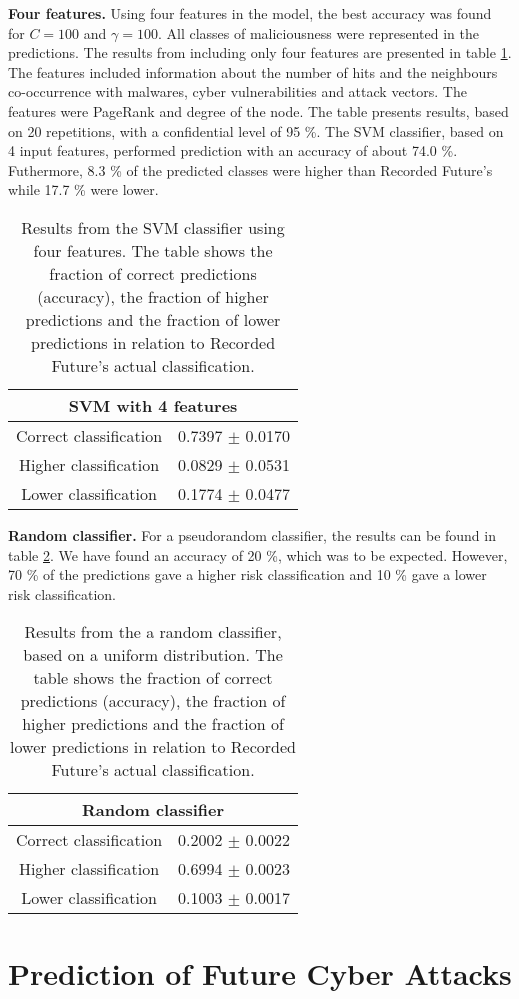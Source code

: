 \textbf{Four features.} Using four features in the model, the best accuracy was found for $C=100$ and $\gamma=100$. All classes of maliciousness were represented in the predictions. The results from including only four features are presented in table \ref{IpRes4Feat}. The features included information about the number of hits and the neighbours co-occurrence with malwares, cyber vulnerabilities and attack vectors. The features were PageRank and degree of the node. The table presents results, based on 20 repetitions, with a confidential level of 95 \%. The SVM classifier, based on 4 input features, performed prediction with an accuracy of about 74.0 \%. Futhermore, 8.3 \% of the predicted classes were higher than Recorded Future's while 17.7 \% were lower. 

\begin{table}[h!]
    \centering
    \caption{Results from the SVM classifier using four features. The table shows the fraction of correct predictions (accuracy), the fraction of higher predictions and the fraction of lower predictions in relation to Recorded Future's actual classification.}
    \begin{tabular}{|c|c|}
    \hline
        \multicolumn{2}{|c|}{SVM with 4 features}\\ \hline
        Correct classification  & 0.7397 $\pm$ 0.0170 \\
        Higher classification   & 0.0829 $\pm$ 0.0531 \\
        Lower classification    & 0.1774 $\pm$ 0.0477 \\ \hline
    \end{tabular}
    \label{IpRes4Feat}
\end{table}

\textbf{Random classifier.} For a pseudorandom classifier, the results can be found in table \ref{randClass}. We have found an accuracy of 20 \%, which was to be expected. However, 70 \% of the predictions gave a higher risk classification and 10 \% gave a lower risk classification.

\begin{table}[h!]
    \centering
    \caption{Results from the a random classifier, based on a uniform distribution. The table shows the fraction of correct predictions (accuracy), the fraction of higher predictions and the fraction of lower predictions in relation to Recorded Future's actual classification.}
    \begin{tabular}{|c|c|}
    \hline
        \multicolumn{2}{|c|}{Random classifier}\\ \hline
        Correct classification & 0.2002 $\pm$ 0.0022 \\
        Higher classification  & 0.6994 $\pm$ 0.0023\\
        Lower classification   & 0.1003 $\pm$ 0.0017\\ \hline
    \end{tabular}
    \label{randClass}
\end{table}

\FloatBarrier
\section{Prediction of Future Cyber Attacks}

